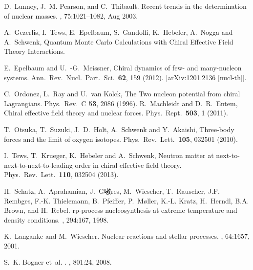 \begin{thebibliography}{200}
D.~Lunney, J.~M. Pearson, and C.~Thibault.
\newblock Recent trends in the determination of nuclear masses.
, 75:1021--1082, Aug 2003.


A.~Gezerlis, I.~Tews, E.~Epelbaum, S.~Gandolfi, K.~Hebeler, A.~Nogga and A.~Schwenk,
\newblock Quantum Monte Carlo Calculations with Chiral Effective Field Theory Interactions.

  E.~Epelbaum and U.~-G.~Meissner,
\newblock Chiral dynamics of few- and many-nucleon systems.
\newblock Ann.\ Rev.\ Nucl.\ Part.\ Sci.\  {\bf 62}, 159 (2012).
  [arXiv:1201.2136 [nucl-th]].


  C.~Ordonez, L.~Ray and U.~van Kolck,
  \newblock The Two nucleon potential from chiral Lagrangians.
  \newblock Phys.\ Rev.\ C {\bf 53}, 2086 (1996).
R.~Machleidt and D.~R.~Entem,
\newblock Chiral effective field theory and nuclear forces.
\newblock Phys.\ Rept.\  {\bf 503}, 1 (2011).

T.~Otsuka, T.~Suzuki, J.~D.~Holt, A.~Schwenk and Y.~Akaishi,
\newblock Three-body forces and the limit of oxygen isotopes.
\newblock Phys.\ Rev.\ Lett.\  {\bf 105}, 032501 (2010).

I.~Tews, T.~Krueger, K.~Hebeler and A.~Schwenk,
\newblock Neutron matter at next-to-next-to-next-to-leading order in chiral effective field theory.
\newblock Phys.\ Rev.\ Lett.\  {\bf 110}, 032504 (2013).


H.~Schatz, A.~Aprahamian, J.~G嗷res, M.~Wiescher, T.~Rauscher, J.F. Rembges,
  F.-K. Thielemann, B.~Pfeiffer, P.~M{\o}ller, K.-L. Kratz, H.~Herndl, B.A.
  Brown, and H.~Rebel.
\newblock rp-process nucleosynthesis at extreme temperature and density
  conditions.
, 294:167, 1998.

K.~Langanke and M.~Wiescher.
\newblock Nuclear reactions and stellar processes.
, 64:1657, 2001.


S.~K. Bogner et~al.
.
, 801:24, 2008.


\end{thebibliography}
